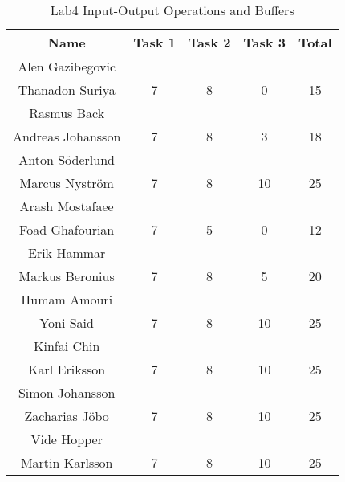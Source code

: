 \documentclass{article}
\begin{document}
\begin{table}[ht]
\caption{Lab4 Input-Output Operations and Buffers}
\centering
\begin{tabular}{c c c c c} 
\hline\hline 
Name & Task 1 & Task 2 & Task 3 & Total \\ [0.5ex] 
\hline
Alen Gazibegovic \\ Thanadon Suriya 
& 7 & 8 & 0 & 15 \\
\hline
Rasmus Back \\ Andreas Johansson 
& 7 & 8 & 3 & 18 \\
\hline 
Anton Söderlund \\ Marcus Nyström
& 7 & 8 & 10 & 25 \\
\hline
Arash Mostafaee \\ Foad Ghafourian
& 7 & 5 & 0 & 12 \\
\hline
Erik Hammar \\ Markus Beronius
& 7 & 8 & 5 & 20 \\
\hline 
Humam Amouri \\ Yoni Said
& 7 & 8 & 10 & 25 \\ 
\hline
Kinfai Chin \\ Karl Eriksson
& 7 & 8 & 10 & 25 \\ 
\hline
Simon Johansson \\ Zacharias Jöbo
& 7 & 8 & 10 & 25 \\
\hline
Vide Hopper \\ Martin Karlsson
& 7 & 8 & 10 & 25 \\ [1ex]
\hline
\end{tabular}
\label{table:nonlin}
\end{table}

\end{document}
